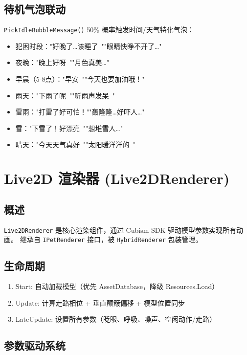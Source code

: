 \documentclass[12pt,a4paper]{ctexart}
\begin{document}
\subsection{待机气泡联动}

\texttt{PickIdleBubbleMessage()} 50\% 概率触发时间/天气特化气泡：

\begin{itemize}
    \item 犯困时段："好晚了…该睡了~""眼睛快睁不开了…"
    \item 夜晚："晚上好呀~""月色真美…"
    \item 早晨（5-8点）："早安~""今天也要加油哦！"
    \item 雨天："下雨了呢~""听雨声发呆~"
    \item 雷雨："打雷了好可怕！""轰隆隆…好吓人…"
    \item 雪："下雪了！好漂亮~""想堆雪人…"
    \item 晴天："今天天气真好~""太阳暖洋洋的~"
\end{itemize}

\section{Live2D 渲染器 (Live2DRenderer)}

\subsection{概述}

\texttt{Live2DRenderer} 是核心渲染组件，通过 Cubism SDK 驱动模型参数实现所有动画。
继承自 \texttt{IPetRenderer} 接口，被 \texttt{HybridRenderer} 包装管理。

\subsection{生命周期}

\begin{enumerate}
    \item Start: 自动加载模型（优先 AssetDatabase，降级 Resources.Load）
    \item Update: 计算走路相位 + 垂直颠簸偏移 + 模型位置同步
    \item LateUpdate: 设置所有参数（眨眼、呼吸、噪声、空闲动作/走路）
\end{enumerate}

\subsection{参数驱动系统}
\end{document}

